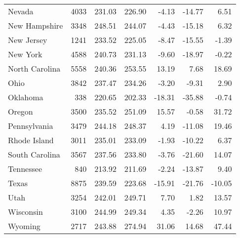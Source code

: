 \begin{table}[ht]
\begin{center}
\begin{tabular}{lrrrrrr}
  Nevada & 4033 & 231.03 & 226.90 & -4.13 & -14.77 & 6.51 \\ 
  New Hampshire & 3348 & 248.51 & 244.07 & -4.43 & -15.18 & 6.32 \\ 
  New Jersey & 1241 & 233.52 & 225.05 & -8.47 & -15.55 & -1.39 \\ 
  New York & 4588 & 240.73 & 231.13 & -9.60 & -18.97 & -0.22 \\ 
  North Carolina & 5558 & 240.36 & 253.55 & 13.19 & 7.68 & 18.69 \\ 
  Ohio & 3842 & 237.47 & 234.26 & -3.20 & -9.31 & 2.90 \\ 
  Oklahoma & 338 & 220.65 & 202.33 & -18.31 & -35.88 & -0.74 \\ 
  Oregon & 3500 & 235.52 & 251.09 & 15.57 & -0.58 & 31.72 \\ 
  Pennsylvania & 3479 & 244.18 & 248.37 & 4.19 & -11.08 & 19.46 \\ 
  Rhode Island & 3011 & 235.01 & 233.09 & -1.93 & -10.22 & 6.37 \\ 
  South Carolina & 3567 & 237.56 & 233.80 & -3.76 & -21.60 & 14.07 \\ 
  Tennessee & 840 & 213.92 & 211.69 & -2.24 & -13.87 & 9.40 \\ 
  Texas & 8875 & 239.59 & 223.68 & -15.91 & -21.76 & -10.05 \\ 
  Utah & 3254 & 242.01 & 249.71 & 7.70 & 1.82 & 13.57 \\ 
  Wisconsin & 3100 & 244.99 & 249.34 & 4.35 & -2.26 & 10.97 \\ 
  Wyoming & 2717 & 243.88 & 274.94 & 31.06 & 14.68 & 47.44 \\ 
   \hline
\end{tabular}
\end{center}
\end{table}
